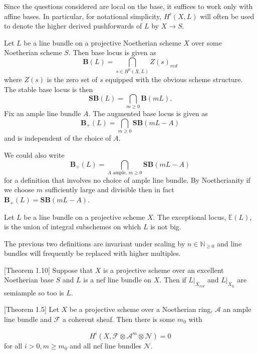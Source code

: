 \documentclass[a4paper,12pt]{book}
\newcommand{\A}{\mathcal{A}}
\newcommand{\F}{\mathcal{F}}
\newcommand{\SB}{\mathbf{SB}}
\newcommand{\BB}{\mathbf{B}}
\newcommand{\BS}{\mathbf{B}_{+}}
\begin{document}
Since the questions considered are local on the base, it suffices to work only with affine bases. In particular, for notational simplicity, $H^{i}(X,L)$ will often be used to denote the higher derived pushforwards of $L$ by $X \to S$. 
	
\begin{definition}
	Let $L$ be a line bundle on a projective Noetherian scheme $X$ over some Noetherian scheme $S$. Then base locus is given as 
	$$\BB(L)= \bigcap_{s \in H^{0}(X,L)} Z(s)_{red}$$
	where $Z(s)$ is the zero set of $s$ equipped with the obvious scheme structure. The stable base locus is then
	$$\SB(L)=\bigcap_{m \geq 0}\BB(mL).$$
	Fix an ample line bundle $A$. The augmented base locus is given as 
	$$\BS(L)=\bigcap_{m \geq 0}\SB(mL-A)$$
	and is independent of the choice of $A$.
\end{definition}

We could also write \[\BS(L)= \bigcap_{A \text{ ample, } m \geq 0}\SB(mL-A)\] for a definition that involves no choice of ample line bundle. By Noetherianity if we choose $m$ sufficiently large and divisible then in fact $\BS(L)=\SB(mL-A)$.

 \begin{definition}
	Let $L$ be a line bundle on a projective scheme $X$. The exceptional locus, $\mathbb{E}(L)$, is the union of integral subschemes on which $L$ is not big.
\end{definition}

The previous two definitions are invariant under scaling by $n \in \mathbb{N}_{\geq 0}$ and line bundles will frequently be replaced with higher multiples.

\begin{theorem}\cite{witaszek2020keels}[Theorem 1.10]\label{red}
	Suppose that $X$ is a projective scheme over an excellent Noetherian base $S$ and $L$ is a nef line bundle on $X$. Then if $L|_{X_{red}}$ and $L|_{X_{\mathbb{Q}}}$ are semiample so too is $L$.
\end{theorem}


\begin{theorem}\cite{keeler2003ample}[Theorem 1.5]\label{{Keeler}}
	Let $X$ be a projective scheme over a Noetherian ring, $\A$ an ample line bundle and $\F$ a coherent sheaf. Then there is some $m_{0}$ with 
	
	\[H^{i}(X, \F \otimes \A^{m} \otimes \mathcal{N})=0\]
	for all $i>0, m \geq m_{0}$ and all nef line bundles $\mathcal{N}$.
\end{theorem}
\end{document}
